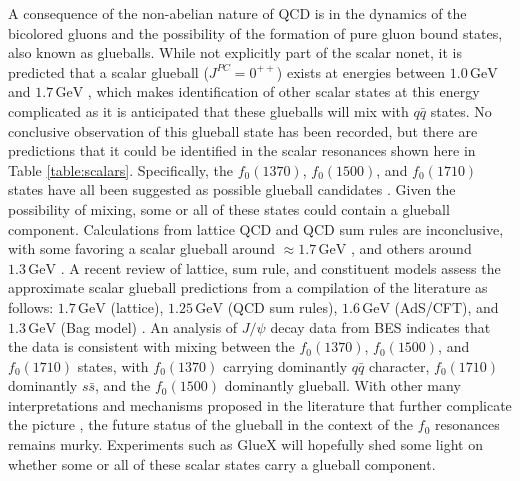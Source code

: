 \documentclass[aps,prd,onecolumn,showpacs,amsmath,amssymb,nofootinbib]{revtex4} \pdfoutput=1
\newcommand{\gev}{\mathrm{GeV}}
\begin{document}
A consequence of the non-abelian nature of QCD is in the dynamics of the bicolored gluons and the possibility of the formation of pure gluon bound states, also known as glueballs. While not explicitly part of the scalar nonet, it is predicted that a scalar glueball ($J^{PC} = 0^{++}$) exists at energies between $1.0\,\gev$ and $1.7\,\gev$ \cite{Ochs2013}, which makes identification of other scalar states at this energy complicated as it is anticipated that these glueballs will mix with $q\bar q$ states. No conclusive observation of this glueball state has been recorded, but there are predictions that it could be identified in the scalar resonances shown here in Table \ref{table:scalars}. Specifically, the $f_0(1370)$, $f_0(1500)$, and $f_0(1710)$ states have all been suggested as possible glueball candidates \cite{Ochs2013, Fariborz2003,Janowski2011}. Given the possibility of mixing, some or all of these states could contain a glueball component. Calculations from lattice QCD and QCD sum rules are inconclusive, with some favoring a scalar glueball around $\approx 1.7 \,\gev$ \cite{Gui2012,Huang1999,Yuan:2009vs}, and others around $1.3\,\gev$ \cite{FORKEL2004}. A recent review of lattice, sum rule, and constituent models assess the approximate scalar glueball predictions from a compilation of the literature as follows: $1.7\,\gev$ (lattice), $1.25\,\gev$ (QCD sum rules), $1.6\,\gev$ (AdS/CFT), and $1.3\,\gev$ (Bag model) \cite{Mathieu:2008me}. An analysis of $J/\psi$ decay data from BES indicates that the data is consistent with mixing between the $f_0(1370)$, $f_0(1500)$, and $f_0(1710)$ states, with $f_0(1370)$ carrying dominantly $q\bar q$ character, $f_0(1710)$ dominantly $s \bar s$, and the $f_0(1500)$ dominantly glueball. With other many interpretations and mechanisms proposed in the literature that further complicate the picture \cite{Janowski:2014ppa,Albaladejo2008}, the future status of the glueball in the context of the $f_0$ resonances remains murky. Experiments such as GlueX \cite{Gutsche2016} will hopefully shed some light on whether some or all of these scalar states carry a glueball component.
\end{document}
